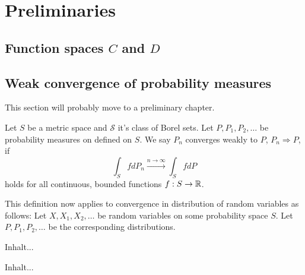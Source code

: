 
\chapter{Preliminaries} \label{C: preliminaries}

\section{Function spaces $C$ and $D$}




\section{Weak convergence of probability measures}

This section will probably move to a preliminary chapter.
\begin{definition}
	Let $S$ be a metric space and $\mathcal{S}$ it's class of Borel sets.
	Let $P, P_1, P_2, \dots$ be probability measures on defined on $S$.
	We say $P_n$ converges weakly to $P$, $P_n \Rightarrow P$, if
	\begin{equation} 
	\int_S fdP_n \xrightarrow{n \rightarrow \infty} \int_S fdP
	\end{equation}
	holds for all continuous, bounded functions $f: S \rightarrow \mathbb{R}$.
\end{definition}

This definition now applies to convergence in distribution of random variables as follows:
Let $X, X_1, X_2, \dots$ be random variables on some probability space $S$.
Let $P, P_1, P_2, \dots$ be the corresponding distributions. 

\begin{definition}[Tightness] \label{D: Tightness}
	Inhalt...
\end{definition}

\begin{definition} \label{D: Rel Compactness}
	Inhalt...
\end{definition}

